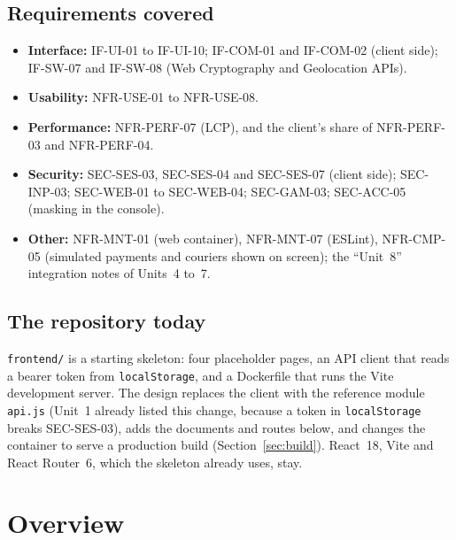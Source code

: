 \documentclass[11pt,a4paper]{article}
\begin{document}
\subsection{Requirements covered}
\begin{itemize}[nosep]
  \item \textbf{Interface:} IF-UI-01 to IF-UI-10; IF-COM-01 and IF-COM-02 (client side); IF-SW-07 and IF-SW-08 (Web Cryptography and Geolocation APIs).
  \item \textbf{Usability:} NFR-USE-01 to NFR-USE-08.
  \item \textbf{Performance:} NFR-PERF-07 (LCP), and the client's share of NFR-PERF-03 and NFR-PERF-04.
  \item \textbf{Security:} SEC-SES-03, SEC-SES-04 and SEC-SES-07 (client side); SEC-INP-03; SEC-WEB-01 to SEC-WEB-04; SEC-GAM-03; SEC-ACC-05 (masking in the console).
  \item \textbf{Other:} NFR-MNT-01 (web container), NFR-MNT-07 (ESLint), NFR-CMP-05 (simulated payments and couriers shown on screen); the ``Unit~8'' integration notes of Units~4 to~7.
\end{itemize}

\subsection{The repository today}
\texttt{frontend/} is a starting skeleton: four placeholder pages, an API client that reads a bearer token from \texttt{localStorage}, and a Dockerfile that runs the Vite development server. The design replaces the client with the reference module \texttt{api.js} (Unit~1 already listed this change, because a token in \texttt{localStorage} breaks SEC-SES-03), adds the documents and routes below, and changes the container to serve a production build (Section~\ref{sec:build}). React~18, Vite and React Router~6, which the skeleton already uses, stay.

\section{Overview}
\end{document}

